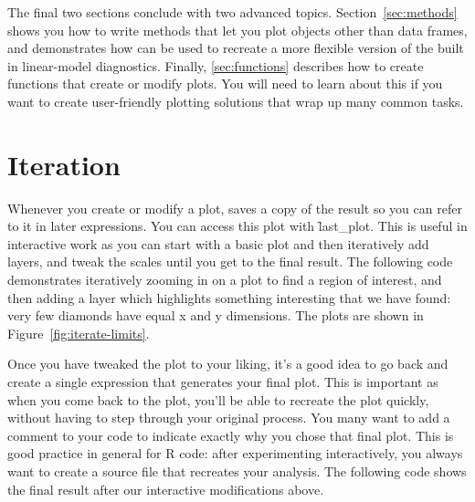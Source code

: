 The final two sections conclude with two advanced topics.  Section~\ref{sec:methods} shows you how to write methods that let you plot objects other than data frames, and demonstrates how \ggplot can be used to recreate a more flexible version of the built in linear-model diagnostics.  Finally, \ref{sec:functions} describes how to create functions that create or modify plots. You will need to learn about this if you want to create user-friendly plotting solutions that wrap up many common tasks.

\section{Iteration}
\label{sec:iteration}

Whenever you create or modify a plot, \ggplot saves a copy of the result so you can refer to it in later expressions. You can access this plot with \f{last_plot}. This is useful in interactive work as you can start with a basic plot and then iteratively add layers, and tweak the scales until you get to the final result. The following code demonstrates iteratively zooming in on a plot to find a region of interest, and then adding a layer which highlights something interesting that we have found: very few diamonds have equal x and y dimensions. The plots are shown in Figure~\ref{fig:iterate-limits}.

% 


Once you have tweaked the plot to your liking, it's a good idea to go back and create a single expression that generates your final plot. This is important as when you come back to the plot, you'll be able to recreate the plot quickly, without having to step through your original process. You many want to add a comment to your code to indicate exactly why you chose that final plot. This is good practice in general for R code: after experimenting interactively, you always want to create a source file that recreates your analysis.  The following code shows the final result after our interactive modifications above.

